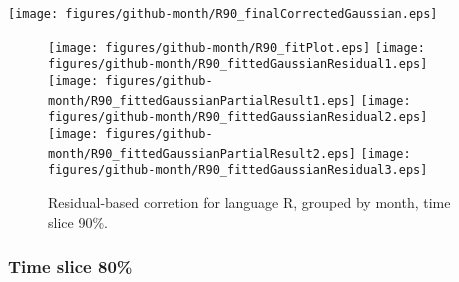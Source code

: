 \begin{center}
{\texttt{[image: figures/github-month/R90\_finalCorrectedGaussian.eps]}}
\end{center}

\FloatBarrier

\begin{figure}[t]
\centering
{}
{\texttt{[image: figures/github-month/R90\_fitPlot.eps]}}
{\texttt{[image: figures/github-month/R90\_fittedGaussianResidual1.eps]}}
{\texttt{[image: figures/github-month/R90\_fittedGaussianPartialResult1.eps]}}
{\texttt{[image: figures/github-month/R90\_fittedGaussianResidual2.eps]}}
{\texttt{[image: figures/github-month/R90\_fittedGaussianPartialResult2.eps]}}
{\texttt{[image: figures/github-month/R90\_fittedGaussianResidual3.eps]}}
\caption{Residual-based corretion for language R, grouped by month, time slice 90\%.}
\end{figure}


\FloatBarrier


\subsubsection{Time slice 80\%}

